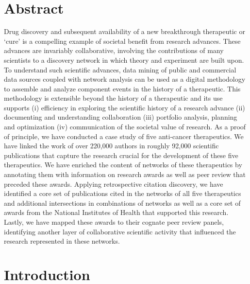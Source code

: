 \documentclass[10pt,letterpaper]{article}
\begin{document}
\section*{Abstract}

Drug discovery and subsequent availability of a new breakthrough therapeutic or `cure' is a compelling example of societal benefit from research advances. These advances are invariably collaborative, involving the contributions of many scientists to a discovery network in which theory and experiment are built upon. To understand such scientific advances, data mining of public and commercial data sources coupled with network analysis can be used as a digital methodology to assemble and analyze component events in the history of a therapeutic. This methodology is extensible beyond the history of a therapeutic and its use supports (i) efficiency in  exploring  the scientific history of a research advance (ii) documenting and understanding collaboration (iii) portfolio analysis, planning and optimization (iv) communication of the societal value of research.  As a proof of principle, we have conducted a case study of five anti-cancer therapeutics. We have linked the work of over 220,000 authors in roughly 92,000 scientific publications that capture the research crucial for the development of these five therapeutics. We have enriched the content of networks of these therapeutics by annotating them with information on research awards as well as peer review that preceded these awards. Applying retrospective citation discovery, we have identified a core set of publications cited in the networks of all five therapeutics and additional intersections in combinations of networks as well as a core set of awards from the National Institutes of Health that supported this research. Lastly, we have mapped these awards to their cognate peer review panels, identifying another layer of collaborative scientific activity that influenced the research represented in these networks. 

\linenumbers

\section*{Introduction}
\end{document}
